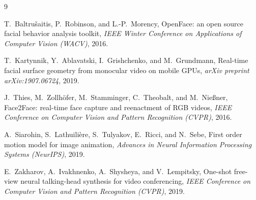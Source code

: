 \documentclass[11pt,a4paper]{article}
\begin{document}
\begin{thebibliography}{9}

T.~Baltru\v{s}aitis, P.~Robinson, and L.-P.~Morency,
\newblock OpenFace: an open source facial behavior analysis toolkit,
\newblock \emph{IEEE Winter Conference on Applications of Computer Vision (WACV)},
  2016.

T.~Kartynnik, Y.~Ablavatski, I.~Grishchenko, and M.~Grundmann,
\newblock Real-time facial surface geometry from monocular video on mobile GPUs,
\newblock \emph{arXiv preprint arXiv:1907.06724}, 2019.

J.~Thies, M.~Zollh\"ofer, M.~Stamminger, C.~Theobalt, and M.~Nie{\ss}ner,
\newblock Face2Face: real-time face capture and reenactment of RGB videos,
\newblock \emph{IEEE Conference on Computer Vision and Pattern Recognition (CVPR)},
  2016.

A.~Siarohin, S.~Lathuili\`ere, S.~Tulyakov, E.~Ricci, and N.~Sebe,
\newblock First order motion model for image animation,
\newblock \emph{Advances in Neural Information Processing Systems (NeurIPS)}, 2019.

E.~Zakharov, A.~Ivakhnenko, A.~Shysheya, and V.~Lempitsky,
\newblock One-shot free-view neural talking-head synthesis for video conferencing,
\newblock \emph{IEEE Conference on Computer Vision and Pattern Recognition (CVPR)},
  2019.

\end{thebibliography}
\end{document}
